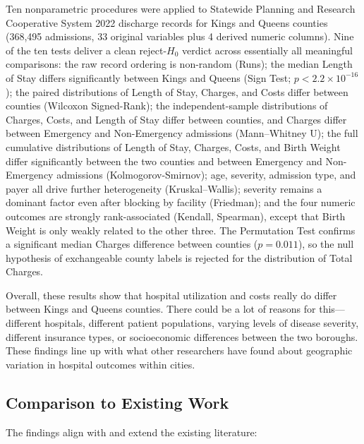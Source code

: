 \documentclass[12pt]{article}
\begin{document}
Ten nonparametric procedures were applied to Statewide Planning and Research Cooperative System 2022 discharge
records for Kings and Queens counties (368{,}495 admissions, 33
original variables plus 4 derived numeric columns). Nine of the ten
tests deliver a clean reject-$H_0$ verdict across essentially all
meaningful comparisons: the raw record ordering is non-random (Runs);
the median Length of Stay differs significantly between Kings and
Queens (Sign Test; $p<2.2\times 10^{-16}$); the paired distributions
of Length of Stay, Charges, and Costs differ between counties (Wilcoxon
Signed-Rank); the independent-sample distributions of Charges, Costs,
and Length of Stay differ between counties, and Charges differ between Emergency
and Non-Emergency admissions (Mann--Whitney U); the full cumulative
distributions of Length of Stay, Charges, Costs, and Birth Weight differ
significantly between the two counties and between Emergency and
Non-Emergency admissions (Kolmogorov-Smirnov); age, severity, admission type, and
payer all drive further heterogeneity (Kruskal--Wallis); severity
remains a dominant factor even after blocking by facility (Friedman);
and the four numeric outcomes are strongly rank-associated (Kendall,
Spearman), except that Birth Weight is only weakly related to the
other three. The Permutation Test confirms a significant median
Charges difference between counties ($p=0.011$), so the null
hypothesis of exchangeable county labels is rejected for the
distribution of Total Charges.

Overall, these results show that hospital utilization and costs really
do differ between Kings and Queens counties. There could be a lot of
reasons for this---different hospitals, different patient populations,
varying levels of disease severity, different insurance types, or
socioeconomic differences between the two boroughs. These findings
line up with what other researchers have found about geographic
variation in hospital outcomes within cities.

\subsection{Comparison to Existing Work}

The findings align with and extend the existing literature:
\end{document}
